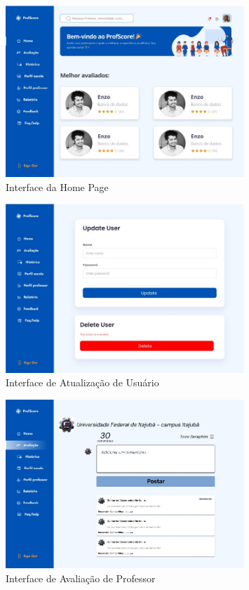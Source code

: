 \documentclass[12pt]{article}
\begin{document}
\begin{figure}[H] %
  \centering
  \includegraphics[width=0.8\textwidth]{interfaces/i3-home.png}
  \caption{Interface da Home Page}
  \label{fig:i3-home}
\end{figure}

\begin{figure}[H] %
  \centering
  \includegraphics[width=0.8\textwidth]{interfaces/i4-update-user.png}
  \caption{Interface de Atualização de Usuário}
  \label{fig:i4-update-user}
\end{figure}

\begin{figure}[H] %
  \centering
  \includegraphics[width=0.8\textwidth]{interfaces/i5-avaliar-prof.png}
  \caption{Interface de Avaliação de Professor}
  \label{fig:i5-avaliar-prof}
\end{figure}
\end{document}

